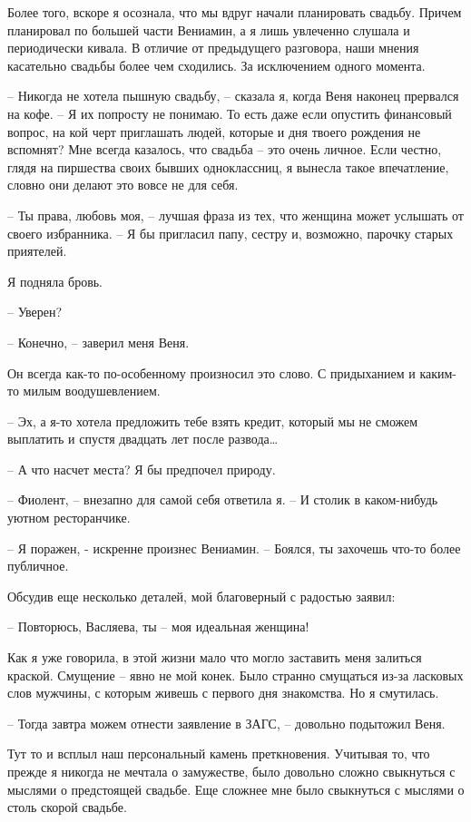 \documentclass[
]{book}
\begin{document}
Более того, вскоре я осознала, что мы вдруг начали планировать свадьбу. Причем планировал по большей части Вениамин, а я лишь увлеченно слушала и периодически кивала. В отличие от предыдущего разговора, наши мнения касательно свадьбы более чем сходились. За исключением одного момента.

-- Никогда не хотела пышную свадьбу, -- сказала я, когда Веня наконец прервался на кофе. -- Я их попросту не понимаю. То есть даже если опустить финансовый вопрос, на кой черт приглашать людей, которые и дня твоего рождения не вспомнят? Мне всегда казалось, что свадьба -- это очень личное. Если честно, глядя на пиршества своих бывших одноклассниц, я вынесла такое впечатление, словно они делают это вовсе не для себя.

-- Ты права, любовь моя, -- лучшая фраза из тех, что женщина может услышать от своего избранника. -- Я бы пригласил папу, сестру и, возможно, парочку старых приятелей.

Я подняла бровь.

-- Уверен?

-- Конечно, -- заверил меня Веня.

Он всегда как-то по-особенному произносил это слово. С придыханием и каким-то милым воодушевлением.

-- Эх, а я-то хотела предложить тебе взять кредит, который мы не сможем выплатить и спустя двадцать лет после развода\ldots{}

-- А что насчет места? Я бы предпочел природу.

-- Фиолент, -- внезапно для самой себя ответила я. -- И столик в каком-нибудь уютном ресторанчике.

-- Я поражен, - искренне произнес Вениамин. -- Боялся, ты захочешь что-то более публичное.

Обсудив еще несколько деталей, мой благоверный с радостью заявил:

-- Повторюсь, Васляева, ты -- моя идеальная женщина!

Как я уже говорила, в этой жизни мало что могло заставить меня залиться краской. Смущение -- явно не мой конек. Было странно смущаться из-за ласковых слов мужчины, с которым живешь с первого дня знакомства. Но я смутилась.

-- Тогда завтра можем отнести заявление в ЗАГС, -- довольно подытожил Веня.

Тут то и всплыл наш персональный камень преткновения. Учитывая то, что прежде я никогда не мечтала о замужестве, было довольно сложно свыкнуться с мыслями о предстоящей свадьбе. Еще сложнее мне было свыкнуться с мыслями о столь скорой свадьбе.
\end{document}
